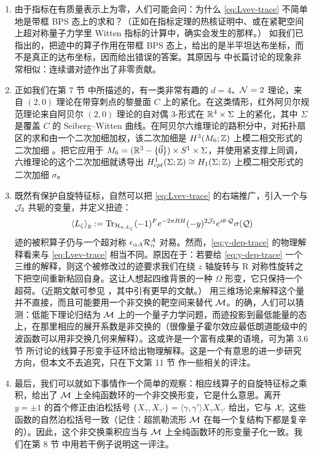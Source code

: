 \begin{enumerate}

\item 由于指标在有质量表示上为零，人们可能会问：为什么 \eqref{eq:Lvev-trace}
不简单地是带框 BPS 态上的求和？（正如在指标定理的热核证明中、或在紧靶空间上超对称量子力学里 Witten 指标的计算中，确实会发生的那样。）
如我们已指出的，把迹中的算子作用在带框 BPS 态上，给出的是半平坦达布坐标，而不是真正的达布坐标，因而给出错误的答案。其原因与 \cite{Cecotti:1992qh} 中长篇讨论的现象非常相似：连续谱对迹作出了非零贡献。

\item 正如我们在第 7 节%
中所描述的，有一类非常有趣的 $d=4$、$\mathcal{N}=2$ 理论，来自 $(2,0)$ 理论在带穿刺点的黎曼面 $C$ 上的紧化。在这类情形，红外阿贝尔规范理论来自阿贝尔 $(2,0)$ 理论的自对偶 3-形式在 $\mathbb{R}^4\times\Sigma$ 上的紧化，其中 $\Sigma$ 是覆盖 $C$ 的 Seiberg--Witten 曲线。在阿贝尔六维理论的路积分中，对拓扑扇区的求和由一个二次加细加权，该二次加细是 $H^3(M_6;\mathbb{Z})$ 上模二相交形式的二次加细 \cite{Witten:1996hc,Freed:2000ta,Hopkins:2002rd,Belov:2006jd}。把它应用于 $M_6=(\mathbb{R}^3-\{\vec 0\})\times S^1\times\Sigma$，并使用紧支撑上同调，六维理论的这个二次加细就诱导出 $H^1_{cpt}(\Sigma;\mathbb{Z})\cong H_1(\Sigma;\mathbb{Z})$ 上模二相交形式的二次加细 $\sigma$。

\item 既然有保护自旋特征标，自然可以把 \eqref{eq:Lvev-trace}
的右端推广，引入一个与 $\mathcal{J}_3$ 共轭的变量，并定义扭迹：
\begin{equation}\label{eq:y-dep-trace}
\langle L_\zeta \rangle_y := {\rm Tr}_{\mathcal{H}_{u, L_\zeta}} (-1)^F e^{-2 \pi R H} (-y)^{2 \mathcal{J}_3} e^{i \theta \cdot \mathcal{Q}}\sigma(\mathcal{Q})
\end{equation}
迹的被积算子仍与一个超对称 $\epsilon_{\alpha A} \mathcal{R}_{\alpha}^A$ 对易。然而，\eqref{eq:y-dep-trace}
的物理解释看来与 \eqref{eq:Lvev-trace}
相当不同。原因在于：若要给 \eqref{eq:y-dep-trace}
一个三维的解释，则这个被修改过的迹要求我们在绕 $z$ 轴旋转与 R 对称性旋转之下把空间重新粘回自身。这让人想起四维背景的一种 $\Omega$ 形变，它只保持一个超荷。（近期文献可参见 \cite{Nekrasov:2010ka}，其中引有更早的文献。）
用三维场论来解释这个量并不直接，而且可能要用一个非交换的靶空间来替代 $\mathcal{M}$。的确，人们可以猜测：低能下理论归结为 $\mathcal{M}$ 上的一个量子力学问题，而迹投影到最低能量的态上，在那里相应的展开系数是非交换的（很像量子霍尔效应最低朗道能级中的波函数可以用非交换几何来解释）。这或许是一个富有成果的语境，可为第 3.6 节%
所讨论的线算子形变手征环给出物理解释。这是一个有意思的进一步研究方向，但本文不去追究，只在下文第 11 节%
作一些相关的评注。

\item 最后，我们可以就如下事情作一个简单的观察：相应线算子的自旋特征标之乘积，给出了 $\mathcal{M}$ 上全纯函数环的一个非交换形变，它是什么意思。离开 $y=\pm 1$ 的首个修正由泊松括号 $\{ X_\gamma,X_{\gamma'}\} = \langle \gamma,\gamma'\rangle X_\gamma X_{\gamma'}$ 给出，它与 $\mathcal{X}_\gamma$ 这些函数的自然泊松括号一致（记住：超凯勒流形 $\mathcal{M}$ 在每一个复结构下都是复辛的）。因此，这个非交换乘积应当与 $\mathcal{M}$ 上全纯函数环的形变量子化一致。我们在第 8 节%
中用若干例子说明这一评注。

\end{enumerate}


